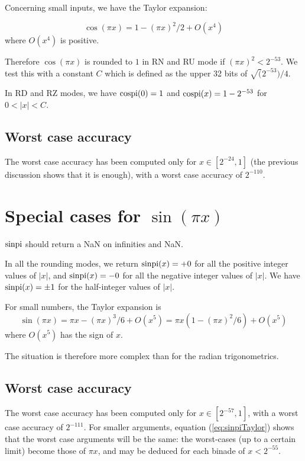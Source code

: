  Concerning small inputs, we have the Taylor expansion:

  \begin{equation}
    \cos(\pi x) = 1-(\pi x)^2/2 + O(x^4)\label{eq:cospiTaylor}
  \end{equation}
 where $O(x^4)$ is positive.

 Therefore $\cos(\pi x)$ is rounded to $1$ in RN and RU mode if $(\pi
 x)^2<{2^{-53}}$. We test this with a constant $C$ which is defined as
 the upper 32 bits of $\sqrt(2^{-53})/4$.

 In RD and RZ modes, we have $\operatorname{cospi}(0)=1$ and $\operatorname{cospi}(x)=1-2^{-53}$
 for $0<|x|<C$. 

\subsection{Worst case accuracy}

The worst case accuracy has been computed only for $x \in [2^{-24},
1]$ (the previous discussion shows that it is enough), with a worst
case accuracy of $2^{-110}$.



\section{Special cases for $\sin(\pi x)$}
$\operatorname{sinpi}$ should return a NaN on infinities and NaN.

In all the rounding modes, we return $\operatorname{sinpi}(x)=+0$ for all the positive
integer values of $|x|$, and $\operatorname{sinpi}(x)=-0$ for all the negative integer
values of $|x|$. We have $\operatorname{sinpi}(x)=\pm 1$ for  the half-integer
values of $|x|$. 

For small numbers, the Taylor expansion is
\begin{equation}
  \sin(\pi x) = \pi x - (\pi x)^3/6 + O(x^5) = \pi x(1-(\pi
  x)^2/6) + O(x^5)\label{eq:sinpiTaylor}
\end{equation}
  where $O(x^5)$ has the sign of $x$. 

The situation is therefore more complex than for the radian
trigonometrics.

\subsection{Worst case accuracy}

The worst case accuracy has been computed only for $x \in [2^{-57},
1]$, with a worst case accuracy of $2^{-111}$. For smaller arguments,
equation (\ref{eq:sinpiTaylor}) shows that the worst case arguments
will be the same: the worst-cases (up to a certain limit) become those
of $\pi x$, and may be deduced for each binade of $x<2^{-55}$.

